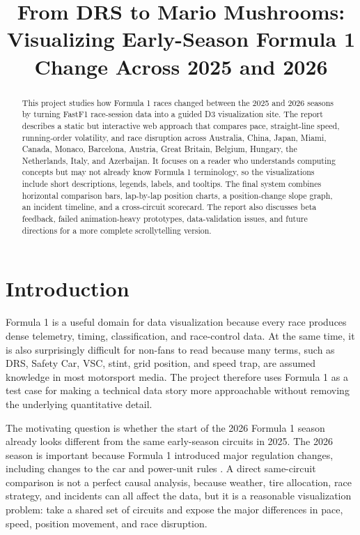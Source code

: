 \documentclass[conference]{IEEEtran}
\title{From DRS to Mario Mushrooms: Visualizing Early-Season Formula 1 Change Across 2025 and 2026}
\author{\IEEEauthorblockN{Alejandro Gonzalez}
\IEEEauthorblockA{Data Visualization Final Project\\
University Course Project}}
\begin{document}
\maketitle

\begin{abstract}
This project studies how Formula 1 races changed between the 2025 and 2026 seasons by turning FastF1 race-session data into a guided D3 visualization site. The report describes a static but interactive web approach that compares pace, straight-line speed, running-order volatility, and race disruption across Australia, China, Japan, Miami, Canada, Monaco, Barcelona, Austria, Great Britain, Belgium, Hungary, the Netherlands, Italy, and Azerbaijan. It focuses on a reader who understands computing concepts but may not already know Formula 1 terminology, so the visualizations include short descriptions, legends, labels, and tooltips. The final system combines horizontal comparison bars, lap-by-lap position charts, a position-change slope graph, an incident timeline, and a cross-circuit scorecard. The report also discusses beta feedback, failed animation-heavy prototypes, data-validation issues, and future directions for a more complete scrollytelling version.
\end{abstract}

\section{Introduction}
Formula 1 is a useful domain for data visualization because every race produces dense telemetry, timing, classification, and race-control data. At the same time, it is also surprisingly difficult for non-fans to read because many terms, such as DRS, Safety Car, VSC, stint, grid position, and speed trap, are assumed knowledge in most motorsport media. The project therefore uses Formula 1 as a test case for making a technical data story more approachable without removing the underlying quantitative detail.

The motivating question is whether the start of the 2026 Formula 1 season already looks different from the same early-season circuits in 2025. The 2026 season is important because Formula 1 introduced major regulation changes, including changes to the car and power-unit rules \cite{fia2026,formula12026}. A direct same-circuit comparison is not a perfect causal analysis, because weather, tire allocation, race strategy, and incidents can all affect the data, but it is a reasonable visualization problem: take a shared set of circuits and expose the major differences in pace, speed, position movement, and race disruption.
\end{document}
